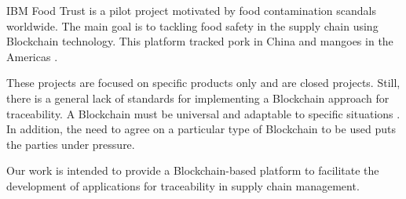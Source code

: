 IBM Food Trust is a pilot project motivated by food contamination scandals worldwide. The main goal is to tackling food safety in the supply chain using Blockchain technology. This platform tracked pork in China and mangoes in the Americas \cite{kamath2018food}.

These projects are focused on specific products only and are closed projects. Still, there is a general lack of standards for implementing a Blockchain approach for traceability. A Blockchain must be universal and adaptable to specific situations \cite{valenta2017comparison}. In addition, the need to agree on a particular type of Blockchain to be used puts the parties under pressure. 

Our work is intended to provide a Blockchain-based platform to facilitate the development of applications for traceability in supply chain management.
